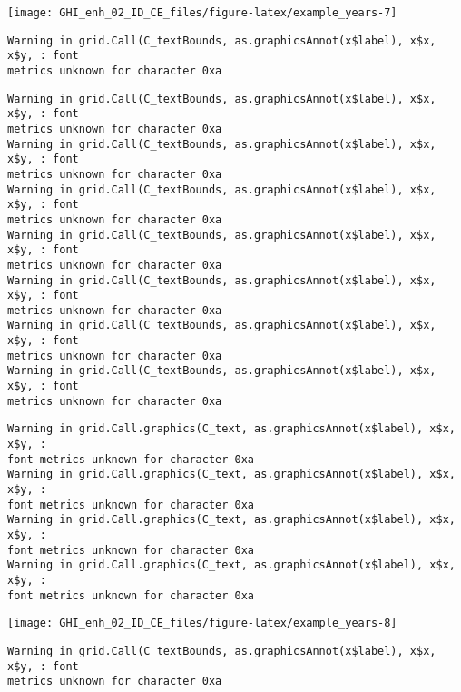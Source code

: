 \documentclass[
  10pt,
  a4paper,oneside]{article}
\begin{document}
\begin{center}\texttt{[image: GHI\_enh\_02\_ID\_CE\_files/figure-latex/example\_years-7]} \end{center}

\begin{verbatim}
Warning in grid.Call(C_textBounds, as.graphicsAnnot(x$label), x$x, x$y, : font
metrics unknown for character 0xa
\end{verbatim}

\begin{verbatim}
Warning in grid.Call(C_textBounds, as.graphicsAnnot(x$label), x$x, x$y, : font
metrics unknown for character 0xa
Warning in grid.Call(C_textBounds, as.graphicsAnnot(x$label), x$x, x$y, : font
metrics unknown for character 0xa
Warning in grid.Call(C_textBounds, as.graphicsAnnot(x$label), x$x, x$y, : font
metrics unknown for character 0xa
Warning in grid.Call(C_textBounds, as.graphicsAnnot(x$label), x$x, x$y, : font
metrics unknown for character 0xa
Warning in grid.Call(C_textBounds, as.graphicsAnnot(x$label), x$x, x$y, : font
metrics unknown for character 0xa
Warning in grid.Call(C_textBounds, as.graphicsAnnot(x$label), x$x, x$y, : font
metrics unknown for character 0xa
Warning in grid.Call(C_textBounds, as.graphicsAnnot(x$label), x$x, x$y, : font
metrics unknown for character 0xa
\end{verbatim}

\begin{verbatim}
Warning in grid.Call.graphics(C_text, as.graphicsAnnot(x$label), x$x, x$y, :
font metrics unknown for character 0xa
Warning in grid.Call.graphics(C_text, as.graphicsAnnot(x$label), x$x, x$y, :
font metrics unknown for character 0xa
Warning in grid.Call.graphics(C_text, as.graphicsAnnot(x$label), x$x, x$y, :
font metrics unknown for character 0xa
Warning in grid.Call.graphics(C_text, as.graphicsAnnot(x$label), x$x, x$y, :
font metrics unknown for character 0xa
\end{verbatim}

\begin{center}\texttt{[image: GHI\_enh\_02\_ID\_CE\_files/figure-latex/example\_years-8]} \end{center}

\begin{verbatim}
Warning in grid.Call(C_textBounds, as.graphicsAnnot(x$label), x$x, x$y, : font
metrics unknown for character 0xa
\end{verbatim}
\end{document}
